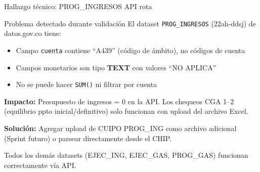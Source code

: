 \documentclass[aspectratio=169,12pt]{beamer}
\begin{document}
\begin{frame}{Hallazgo t\'ecnico: PROG\_INGRESOS API rota}

\begin{block}{Problema detectado durante validaci\'on}
El dataset \texttt{PROG\_INGRESOS} (22ah-ddsj) de datos.gov.co tiene:
\begin{itemize}
    \item Campo \texttt{cuenta} contiene ``A439'' (c\'odigo de \'ambito), no c\'odigos de cuenta
    \item Campos monetarios son tipo \textbf{TEXT} con valores ``NO APLICA''
    \item No se puede hacer \texttt{SUM()} ni filtrar por cuenta
\end{itemize}
\end{block}

\vspace{6pt}

\textbf{Impacto:} Presupuesto de ingresos = 0 en la API. Los chequeos CGA 1--2 (equilibrio ppto inicial/definitivo) solo funcionan con upload del archivo Excel.

\vspace{6pt}

\textbf{Soluci\'on:} Agregar upload de CUIPO PROG\_ING como archivo adicional (Sprint futuro) o parsear directamente desde el CHIP.

\vspace{6pt}

\textcolor{sepia}{\small Todos los dem\'as datasets (EJEC\_ING, EJEC\_GAS, PROG\_GAS) funcionan correctamente v\'ia API.}
\end{frame}
\end{document}
